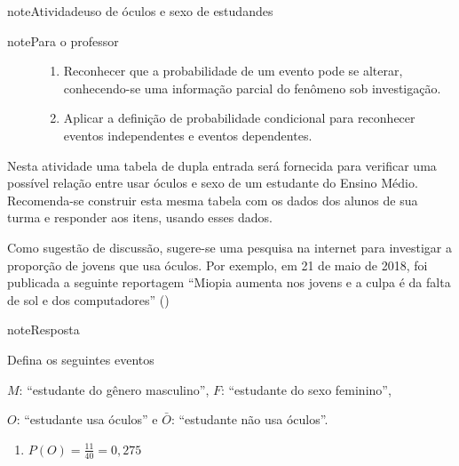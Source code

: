 \label{\detokenize{PE511-6:explorando-probabilidade-condicional}}\label{\detokenize{PE511-6::doc}}\label{\detokenize{PE511-6:sec-probabilidade-condicional-explorando}}\begin{sphinxadmonition}{note}{Atividade}{uso de óculos e sexo de estudandes}
\label{ativ-uso-de-oculos-e-sexo}

\begin{sphinxadmonition}{note}{Para o professor}
\begin{description}
\item[{}] \leavevmode\begin{enumerate}
\item {} 
Reconhecer que a probabilidade de um evento pode se alterar, conhecendo-se uma informação parcial do fenômeno sob investigação.

\item {} 
Aplicar a definição de probabilidade condicional para reconhecer eventos independentes e eventos dependentes.

\end{enumerate}

\end{description}

 Nesta atividade uma tabela de dupla entrada será fornecida para verificar uma possível relação entre usar óculos e sexo de um estudante do Ensino Médio. Recomenda-se construir esta mesma tabela com os dados dos alunos de sua turma e responder aos itens, usando esses dados.

Como sugestão de discussão, sugere-se uma pesquisa na internet para investigar a proporção de jovens que usa óculos. Por exemplo, em 21 de maio de 2018, foi publicada a seguinte reportagem “Miopia aumenta nos jovens e a culpa é da falta de sol e dos computadores” ()

\begin{sphinxadmonition}{note}{Resposta}

Defina os seguintes eventos

\(M\): “estudante do gênero masculino”, \(F\): “estudante do sexo feminino”,

\(O\): “estudante usa óculos” e \(\bar{O}\): “estudante não usa óculos”.
\begin{enumerate}
\item {} 
\(P(O)=\frac{11}{40}=0,275\)


\end{enumerate}
\end{sphinxadmonition}
\end{sphinxadmonition}
\end{sphinxadmonition}
